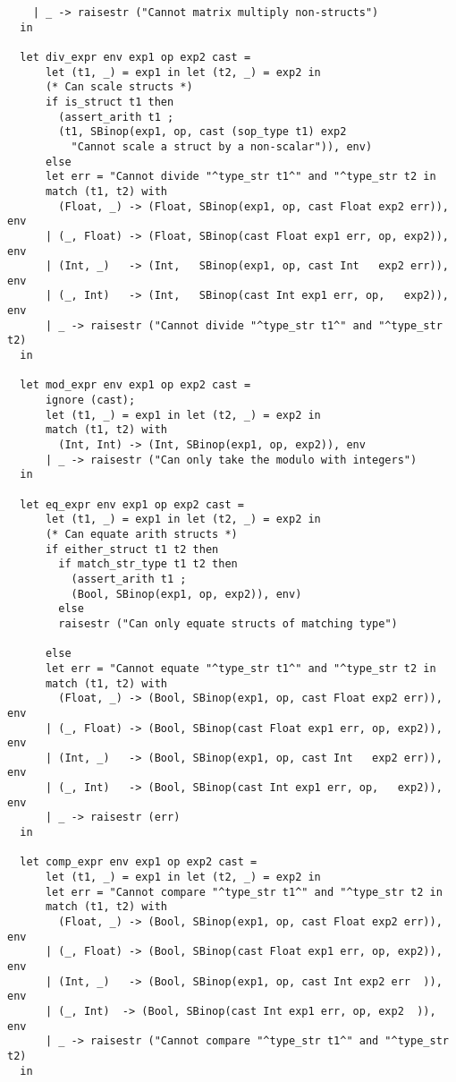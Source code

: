 \documentclass[main.tex]{subfiles}
\begin{document}
\begin{lstlisting}
    | _ -> raisestr ("Cannot matrix multiply non-structs")
  in

  let div_expr env exp1 op exp2 cast = 
      let (t1, _) = exp1 in let (t2, _) = exp2 in
      (* Can scale structs *)
      if is_struct t1 then
        (assert_arith t1 ;
        (t1, SBinop(exp1, op, cast (sop_type t1) exp2
          "Cannot scale a struct by a non-scalar")), env)
      else
      let err = "Cannot divide "^type_str t1^" and "^type_str t2 in
      match (t1, t2) with
        (Float, _) -> (Float, SBinop(exp1, op, cast Float exp2 err)), env
      | (_, Float) -> (Float, SBinop(cast Float exp1 err, op, exp2)), env
      | (Int, _)   -> (Int,   SBinop(exp1, op, cast Int   exp2 err)), env
      | (_, Int)   -> (Int,   SBinop(cast Int exp1 err, op,   exp2)), env
      | _ -> raisestr ("Cannot divide "^type_str t1^" and "^type_str t2)
  in

  let mod_expr env exp1 op exp2 cast = 
      ignore (cast); 
      let (t1, _) = exp1 in let (t2, _) = exp2 in
      match (t1, t2) with
        (Int, Int) -> (Int, SBinop(exp1, op, exp2)), env
      | _ -> raisestr ("Can only take the modulo with integers")
  in

  let eq_expr env exp1 op exp2 cast = 
      let (t1, _) = exp1 in let (t2, _) = exp2 in
      (* Can equate arith structs *)
      if either_struct t1 t2 then
        if match_str_type t1 t2 then
          (assert_arith t1 ;
          (Bool, SBinop(exp1, op, exp2)), env)
        else
        raisestr ("Can only equate structs of matching type")

      else
      let err = "Cannot equate "^type_str t1^" and "^type_str t2 in
      match (t1, t2) with
        (Float, _) -> (Bool, SBinop(exp1, op, cast Float exp2 err)), env
      | (_, Float) -> (Bool, SBinop(cast Float exp1 err, op, exp2)), env
      | (Int, _)   -> (Bool, SBinop(exp1, op, cast Int   exp2 err)), env
      | (_, Int)   -> (Bool, SBinop(cast Int exp1 err, op,   exp2)), env
      | _ -> raisestr (err)
  in

  let comp_expr env exp1 op exp2 cast = 
      let (t1, _) = exp1 in let (t2, _) = exp2 in
      let err = "Cannot compare "^type_str t1^" and "^type_str t2 in
      match (t1, t2) with
        (Float, _) -> (Bool, SBinop(exp1, op, cast Float exp2 err)), env
      | (_, Float) -> (Bool, SBinop(cast Float exp1 err, op, exp2)), env
      | (Int, _)   -> (Bool, SBinop(exp1, op, cast Int exp2 err  )), env
      | (_, Int)  -> (Bool, SBinop(cast Int exp1 err, op, exp2  )), env
      | _ -> raisestr ("Cannot compare "^type_str t1^" and "^type_str t2)
  in


\end{lstlisting}
\end{document}
